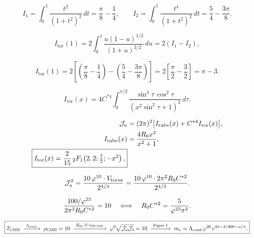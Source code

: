 \begin{equation}
  I_1 = \int_0^1\frac{t^2}{(1+t^2)^2}\,dt = \frac{\pi}{8}-\frac{1}{4},
  \qquad
  I_2 = \int_0^1\frac{t^4}{(1+t^2)^2}\,dt = \frac{5}{4}-\frac{3\pi}{8}.
  \label{P12:eq:I1I2}
\end{equation}

\begin{equation}
  I_{\mathrm{tor}}(1)
  = 2\!\int_0^1\!\frac{u(1-u)^{1/2}}{(1+u)^{3/2}}\,du
  = 2(I_1 - I_2),
  \label{P12:eq:Itor1_split}
\end{equation}

\begin{equation}
  I_{\mathrm{tor}}(1)
  = 2\!\left[\left(\frac{\pi}{8}-\frac{1}{4}\right)
             -\left(\frac{5}{4}-\frac{3\pi}{8}\right)\right]
  = 2\!\left[\frac{\pi}{2}-\frac{3}{2}\right]
  = \pi - 3.
  \label{P12:eq:Itor1_value}
\end{equation}

\begin{equation}
  I_{\mathrm{tor}}(x)
  = 4C^{*4}\int_0^{\pi/2}
    \frac{\sin^3\!\tau\,\cos^2\!\tau}{(x^2\sin^2\!\tau+1)^2}\,d\tau.
  \label{P12:eq:Itor_trig}
\end{equation}

\begin{align}
  \mathcal{J}_a &= (2\pi)^2\bigl[I_{\mathrm{tube}}(x)+ C^{*4}I_{\mathrm{tor}}(x)\bigr],
  \\
  I_{\mathrm{tube}}(x) &= \frac{4R_0 x^2}{x^2+1},
  \\
  \boxed{
  I_{\mathrm{tor}}(x) = \frac{2}{15}\,{}_2F_1\!\left(2,2;\tfrac{7}{2};-x^2\right),
  }
\end{align}

\begin{equation}
  \mathcal{J}_a^2 = \frac{10\,\varphi^{10}\cdot V_{\mathrm{torus}}}{2^{4/3}}
        = \frac{10\,\varphi^{10}\cdot 2\pi^2 R_0 C^{*2}}{2^{4/3}}.
  \label{P12:eq:Ja_sq_from_B}
\end{equation}

\begin{equation}
  \frac{100/\varphi^{23}}{2\pi^2 R_0 C^{*2}} = 10
  \quad\Longleftrightarrow\quad
  R_0 C^{*2} = \frac{5}{\varphi^{23}\pi^2}.
  \label{P12:eq:RC2_derivation}
\end{equation}

\begin{equation}
  \boxed{
  T_{\mathrm{CMB}}
  \;\xrightarrow{\;\Lambda_{\mathrm{cond}}\;}\;
  \rho_{\mathrm{CMB}}=10
  \;\xrightarrow{\;E_{\mathrm{fb}}/V=\rho_{\mathrm{CMB}}\;}\;
  \varphi^9\sqrt{\mathcal{J}_a\mathcal{J}_4}=10
  \;\xrightarrow{\;\text{Paper~I}\;}\;
  m_e = \Lambda_{\mathrm{cond}}\,\varphi^{20}\,e^{4\pi-3/400-\alpha/\pi}.
  }
  \label{P12:eq:chain}
\end{equation}

